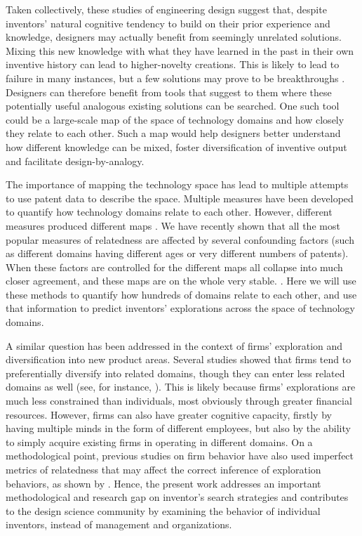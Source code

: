 \documentclass{dsj}
\begin{document}
Taken collectively, these studies of engineering design suggest that, despite inventors' natural cognitive tendency to build on their prior experience and knowledge, designers may actually benefit from seemingly unrelated solutions. Mixing this new knowledge with what they have learned in the past in their own inventive history can lead to higher-novelty creations. This is likely to lead to failure in many instances, but a few solutions may prove to be breakthroughs \cite{Fleming2007a}. Designers can therefore benefit from tools that suggest to them where these potentially useful analogous existing solutions can be searched. One such tool could be a large-scale map of the space of technology domains and how closely they relate to each other. Such a map would help designers better understand how different knowledge can be mixed, foster diversification of inventive output and facilitate design-by-analogy.

The importance of mapping the technology space has lead to multiple attempts to use patent data to describe the space. Multiple measures have been developed to quantify how technology domains relate to each other. However, different measures produced different maps \cite{Kay2014, Leydesdorff2014, Schoen2012}. We have recently shown that all the most popular measures of relatedness are affected by several confounding factors (such as different domains having different ages or very different numbers of patents). When these factors are controlled for the different maps all collapse into much closer agreement, and these maps are on the whole very stable. \cite{Alstott2017}. Here we will use these methods to quantify how hundreds of domains relate to each other, and use that information to predict inventors' explorations across the space of technology domains.

A similar question has been addressed in the context of firms’ exploration and diversification into new product areas. Several studies showed that firms tend to preferentially diversify into related domains, though they can enter less related domains as well (see, for instance, \cite{Neffke2013, Leten2007, Nooteboom2007, Bottazzi2010, Breschi2003}). This is likely because firms’ explorations are much less constrained than individuals, most obviously through greater financial resources. However, firms can also have greater cognitive capacity, firstly by having multiple minds in the form of different employees, but also by the ability to simply acquire existing firms in operating in different domains. On a methodological point, previous studies on firm behavior have also used imperfect metrics of relatedness that may affect the correct inference of exploration behaviors, as shown by \cite{Bottazzi2010}. Hence, the present work addresses an important methodological and research gap on inventor’s search strategies and contributes to the design science community by examining the behavior of individual inventors, instead of management and organizations.
\end{document}
